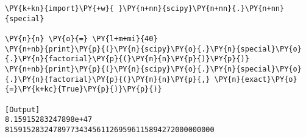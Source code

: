 \begin{Verbatim}[label=\makebox{\href{https://github.com/unipi-physics-labs/statnotes/tree/main/snippy/scipy.special.factorial.py}{https://github.com/.../scipy.special.factorial.py}},commandchars=\\\{\}]
\PY{k+kn}{import}\PY{+w}{ }\PY{n+nn}{scipy}\PY{n+nn}{.}\PY{n+nn}{special}

\PY{n}{n} \PY{o}{=} \PY{l+m+mi}{40}
\PY{n+nb}{print}\PY{p}{(}\PY{n}{scipy}\PY{o}{.}\PY{n}{special}\PY{o}{.}\PY{n}{factorial}\PY{p}{(}\PY{n}{n}\PY{p}{)}\PY{p}{)}
\PY{n+nb}{print}\PY{p}{(}\PY{n}{scipy}\PY{o}{.}\PY{n}{special}\PY{o}{.}\PY{n}{factorial}\PY{p}{(}\PY{n}{n}\PY{p}{,} \PY{n}{exact}\PY{o}{=}\PY{k+kc}{True}\PY{p}{)}\PY{p}{)}

[Output]
8.15915283247898e+47
815915283247897734345611269596115894272000000000
\end{Verbatim}
